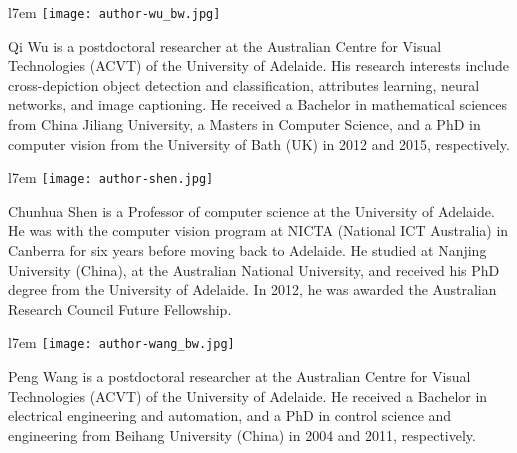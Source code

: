 \documentclass[10pt,journal,compsoc]{IEEEtran}
\begin{document}





\vspace{-1cm}
\begin{wrapfigure}{l}{7em}
\vspace{-10pt}
  \texttt{[image: author-wu\_bw.jpg]}
\end{wrapfigure}
\begin{IEEEbiographynophoto}{Qi Wu}
is a postdoctoral researcher at the Australian Centre for Visual Technologies (ACVT) of the University of Adelaide. His research interests include cross-depiction object detection and classification, attributes learning, neural networks, and image captioning. He received a Bachelor in mathematical sciences from China Jiliang University, a Masters in Computer Science, and a PhD in computer vision from the University of Bath (UK) in 2012 and 2015, respectively.
\end{IEEEbiographynophoto}

\vspace{-1cm}
\begin{wrapfigure}{l}{7em}
\vspace{-10pt}
  \texttt{[image: author-shen.jpg]}
\end{wrapfigure}
\begin{IEEEbiographynophoto}{Chunhua Shen}
is a Professor of computer science at the University of Adelaide. He was with the computer vision program at NICTA (National ICT Australia) in Canberra for six years before moving back to Adelaide. He studied at Nanjing University (China), at the Australian National University, and received his PhD degree from the University of Adelaide. In 2012, he was awarded the Australian Research Council Future Fellowship.
\end{IEEEbiographynophoto}

\vspace{-1cm}
\begin{wrapfigure}{l}{7em}
\vspace{-10pt}
  \texttt{[image: author-wang\_bw.jpg]}
\end{wrapfigure}
\begin{IEEEbiographynophoto}{Peng Wang}
is a postdoctoral researcher at the Australian Centre for Visual Technologies (ACVT) of the University of Adelaide. He received a Bachelor in electrical engineering and automation, and a PhD in control science and engineering from Beihang University (China) in 2004 and 2011, respectively.
\end{IEEEbiographynophoto}
\end{document}
